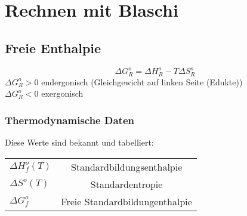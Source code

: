 \documentclass{article}
\begin{document}
\section{Rechnen mit Blaschi}
\subsection{Freie Enthalpie}
\begin{equation*}
    \Delta G_R^o = \Delta H_R^o - T \Delta S_R ^o
\end{equation*}
$\Delta G_R^o > 0$ endergonisch (Gleichgewicht auf linken Seite (Edukte))\\
$\Delta G_R^o < 0$ exergonisch

\subsubsection{Thermodynamische Daten}
Diese Werte sind bekannt und tabelliert:\\
\begin{center}
    \begin{tabular}{l |c}
        \hline
        $\Delta H_f^o(T)$ & Standardbildungsenthalpie \\ $\Delta S^o(T)$ & Standardentropie \\ $\Delta G_f^o$ & Freie Standardbildungenthalpie\\\hline
    \end{tabular}
\end{center}
\end{document}
